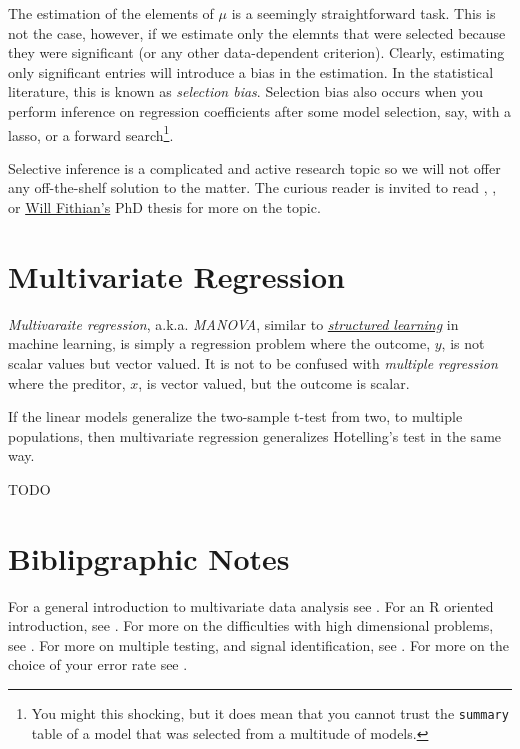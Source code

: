\documentclass[]{book}
\theoremstyle{definition}
\theoremstyle{definition}
\theoremstyle{remark}
\begin{document}
The estimation of the elements of \(\mu\) is a seemingly straightforward
task. This is not the case, however, if we estimate only the elemnts
that were selected because they were significant (or any other
data-dependent criterion). Clearly, estimating only significant entries
will introduce a bias in the estimation. In the statistical literature,
this is known as \emph{selection bias}. Selection bias also occurs when
you perform inference on regression coefficients after some model
selection, say, with a lasso, or a forward search\footnote{You might
  this shocking, but it does mean that you cannot trust the
  \texttt{summary} table of a model that was selected from a multitude
  of models.}.

Selective inference is a complicated and active research topic so we
will not offer any off-the-shelf solution to the matter. The curious
reader is invited to read \citet{rosenblatt2014selective},
\citet{javanmard2014confidence}, or
\href{http://www.stat.berkeley.edu/~wfithian/}{Will Fithian's} PhD
thesis \citep{fithian2015topics} for more on the topic.

\section{Multivariate Regression}\label{multivariate-regression}

\emph{Multivaraite regression}, a.k.a. \emph{MANOVA}, similar to
\href{https://en.wikipedia.org/wiki/Structured_prediction}{\emph{structured
learning}} in machine learning, is simply a regression problem where the
outcome, \(y\), is not scalar values but vector valued. It is not to be
confused with \emph{multiple regression} where the preditor, \(x\), is
vector valued, but the outcome is scalar.

If the linear models generalize the two-sample t-test from two, to
multiple populations, then multivariate regression generalizes
Hotelling's test in the same way.

TODO

\section{Biblipgraphic Notes}\label{biblipgraphic-notes}

For a general introduction to multivariate data analysis see
\citet{anderson2004introduction}. For an R oriented introduction, see
\citet{everitt2011introduction}. For more on the difficulties with high
dimensional problems, see \citet{bai1996effect}. For more on multiple
testing, and signal identification, see \citet{efron2012large}. For more
on the choice of your error rate see \citet{rosenblatt2013practitioner}.
\end{document}

